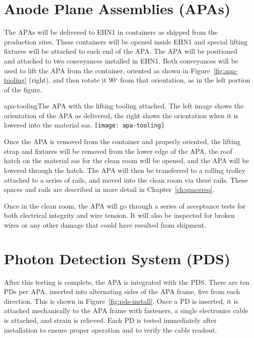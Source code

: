  
\section{Anode Plane Assemblies (APAs)}

The APAs will be delivered to EHN1 in containers as shipped from the production sites.  These containers will be opened inside EHN1 and special lifting fixtures will be attached to each end of the APA.  The APA will be positioned and attached to two conveyances installed in EHN1.  Both conveyances will be used to lift the APA from the container, oriented as shown in Figure~\ref{fig:apa-tooling} (right), and then rotate it 90$^\circ$ from that orientation, as in the left portion of the figure.

\begin{cdrfigure}{apa-tooling}{The APA with the lifting tooling attached.  The left image shows the orientation of the APA as delivered, the right shows the orientation when it is lowered into the material sas. }
\texttt{[image: apa-tooling]}
\end{cdrfigure}

Once the APA is removed from the container and properly oriented, the lifting strap and fixtures will be removed from the lower edge of the APA, the roof hatch on the material sas for 
 the clean room will be opened, and the APA will be lowered through the hatch.  The APA will then be transferred to a rolling trolley attached to a series of rails, and moved into the clean room via these rails.  These spaces and rails are described in more detail in Chapter~\ref{ch:spacereq}. 

Once in the clean room, the APA will go through a series of acceptance tests for both electrical integrity and wire tension.  It will also be inspected for broken wires or any other damage that could have resulted from shipment.  

\section{Photon Detection System (PDS)}

After this testing is complete, the APA is integrated with the PDS.  There are ten PDs per APA, inserted into alternating sides of the APA frame, %
five from each direction.  This is shown in Figure~\ref{fig:pds-install}.  Once a PD is inserted, it is attached mechanically to the APA frame with fasteners, a single electronics cable is attached, and strain is relieved.  Each PD is tested immediately after installation to ensure proper operation and to verify the cable readout.  

